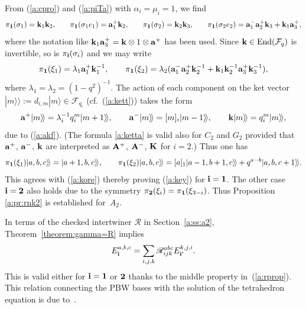 From (\ref{a:cpro}) and (\ref{a:piTa}) with $\alpha_i=\mu_i=1$, we f\/ind
\begin{gather*}
\pi_{{\bf 1}}(\sigma_1) = {\bf k}_1{\bf k}_2,\qquad\!
\pi_{{\bf 1}}(\sigma_1e_1)
= {\rm{\bf a}}^+_1{\bf k}_2,\qquad\!
\pi_{{\bf 1}}(\sigma_2) ={\bf k}_2{\bf k}_3,\qquad\!
\pi_{{\bf 1}}(\sigma_2e_2) =
{\rm{\bf a}}^-_1{\rm{\bf a}}^+_2{\bf k}_3
+{\bf k}_1{\rm{\bf a}}^+_3,
\end{gather*}
where the notation like
${\bf k}_1{\rm{\bf a}}^+_3 = {\bf k}\otimes 1 \otimes {\rm{\bf a}}^+$
has been used.
Since ${\bf k}\in \mathrm{End}({\mathcal F}_q)$ is invertible,
so is $\pi_{\bf i}(\sigma_i)$ and we may write
\begin{gather*}
\pi_{\bf 1}(\xi_1) = \lambda_1
{\rm{\bf a}}^+_1{\bf k}^{-1}_1,\qquad
\pi_{\bf 1}(\xi_2) = \lambda_2
({\rm{\bf a}}^-_1{\rm{\bf a}}^+_2{\bf k}^{-1}_2
+{\bf k}_1{\bf k}^{-1}_2{\rm{\bf a}}^+_3{\bf k}^{-1}_3),
\end{gather*}
where $\lambda_1=\lambda_2 = (1-q^2)^{-1}$.
The action of each component on the ket vector
$|m\rangle\!\rangle :=d_{i,m}|m\rangle \in {\mathcal F}_{q_i}$
(cf.~(\ref{a:kett})) takes the form
\begin{gather}\label{a:ketta}
{\rm{\bf a}}^+|m\rangle\!\rangle =
\lambda_i^{-1}q_i^m|m+1\rangle\!\rangle,\qquad
{\rm{\bf a}}^-|m\rangle\!\rangle =
[m]_i|m-1\rangle\!\rangle,\qquad
{\bf k}|m\rangle\!\rangle=q_i^m|m\rangle\!\rangle,
\end{gather}
due to (\ref{a:akf}).
(The formula \eqref{a:ketta} is valid also for $C_2$ and $G_2$
provided that ${\rm{\bf a}}^+$, ${\rm{\bf a}}^-$, ${\rm{\bf k}}$
are interpreted as
${\rm{\bf A}}^+$, ${\rm{\bf A}}^-$, ${\rm{\bf K}}$
for $i=2$.)
Thus one has
\begin{gather*}
\pi_{\bf 1}(\xi_1)|a,b,c\rangle\!\rangle =
|a+1,b,c\rangle\!\rangle,
\qquad
\pi_{\bf 1}(\xi_2)|a,b,c\rangle\!\rangle =
[a]_1|a-1,b+1,c\rangle\!\rangle
+q^{a-b}|a,b,c+1\rangle\!\rangle.
\end{gather*}
This agrees with (\ref{a:kore}) thereby
proving (\ref{a:key}) for ${\bf i}={\bf 1}$.
The other case  ${\bf i}={\bf 2}$ also holds due to the
symmetry $\pi_{\bf 2}(\xi_i) = \pi_{\bf 1}(\xi_{3-i})$.
Thus Proposition \ref{a:pr:rnk2} is established for~$A_2$.

In terms of the checked intertwiner $\mathscr{R}$ in Section~\ref{a:ss:a2},
Theorem~\ref{theorem:gamma=R} implies
\begin{gather*}
E^{a,b,c}_{\bf i} = \sum_{i,j,k}
\mathscr{R}^{a b c}_{i j k} E^{k,j,i}_{{\bf i}'}.
\end{gather*}
This is valid either for ${\bf i}={\bf 1}$ or ${\bf 2}$
thanks to the middle property in~(\ref{a:rprop}).
This relation connecting the PBW bases with
the solution of the tetrahedron equation is due to~\cite{S08}.


